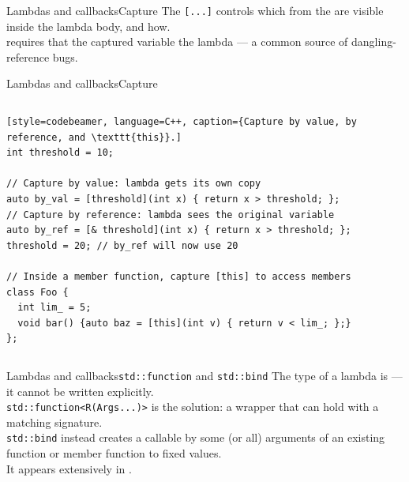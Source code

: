 \begin{frame}{Lambdas and callbacks}{Capture}
	\justifying
	The  \texttt{[...]} controls which  from the  are visible inside the lambda body, and how.\\
  \bigskip
   requires that the captured variable  the lambda — a common source of dangling-reference bugs.
\end{frame}
\begin{frame}[fragile]{Lambdas and callbacks}{Capture}
  \begin{columns}
		\begin{lstlisting}[style=codebeamer, language=C++, caption={Capture by value, by reference, and \texttt{this}}.]
int threshold = 10;

// Capture by value: lambda gets its own copy
auto by_val = [threshold](int x) { return x > threshold; };
// Capture by reference: lambda sees the original variable
auto by_ref = [& threshold](int x) { return x > threshold; };
threshold = 20; // by_ref will now use 20

// Inside a member function, capture [this] to access members
class Foo {
  int lim_ = 5;
  void bar() {auto baz = [this](int v) { return v < lim_; };}
};
    \end{lstlisting}
	\end{columns}
\end{frame}
\begin{frame}{Lambdas and callbacks}{\texttt{std::function} and \texttt{std::bind}}
	\justifying
	The type of a lambda is  — it cannot be written explicitly.\\
	\texttt{std::function<R(Args...)>} is the solution: a  wrapper that can hold  with a matching signature.\\
  \bigskip
  \texttt{std::bind} instead creates a callable by  some (or all) arguments of an existing function or member function to fixed values.\\
	\bigskip
	It appears extensively in .
\end{frame}
